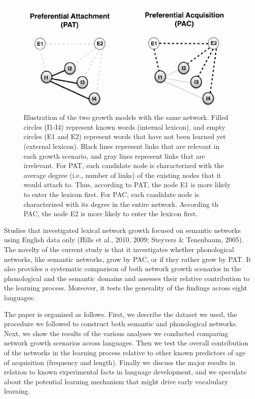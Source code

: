 \documentclass[10pt, letterpaper]{article}
\newenvironment{CodeChunk}{}{}
\begin{document}
\begin{CodeChunk}
\begin{figure}[H]

{\centering \includegraphics{figs/growth-1} 

}

\caption{\label{fig:growth}Illustration of the two growth models with the same network. Filled circles (I1-I4) represent known words (internal lexicon), and empty circles (E1 and E2) represent words that have not been learned yet (external lexicon). Black lines represent links that are relevant in each growth scenario, and gray lines represent links that are irrelevant. For PAT, each candidate node is characterized with the average degree (i.e., number of links) of the existing nodes that it would attach to. Thus, according to PAT, the node E1 is more likely to enter the lexicon first. For PAC, each candidate node is characterized with its degree in the entire network. According th PAC, the node E2 is more likely to enter the lexicon first.}\label{fig:growth}
\end{figure}
\end{CodeChunk}

Studies that investigated lexical network growth focused on semantic
networks using English data only (Hills et al., 2010, 2009; Steyvers \&
Tenenbaum, 2005). The novelty of the current study is that it
investigates whether phonological networks, like semantic networks, grow
by PAC, or if they rather grow by PAT. It also provides a systematic
comparison of both network growth scenarios in the phonological and the
semantic domains and assesses their relative contribution to the
learning process. Moreover, it tests the generality of the findings
across eight languages.

The paper is organized as follows. First, we describe the dataset we
used, the procedure we followed to construct both semantic and
phonological networks. Next, we show the results of the various analyses
we conducted comparing network growth scenarios across languages. Then
we test the overall contribution of the networks in the learning process
relative to other known predictors of age of acquisition (frequency and
length). Finally we discuss the major results in relation to known
experimental facts in language development, and we speculate about the
potential learning mechanism that might drive early vocabulary learning.
\end{document}
